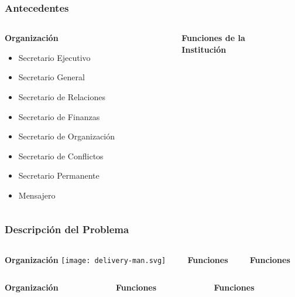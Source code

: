 \documentclass[xcolor=dvipsnames]{beamer}
\begin{document}
\begin{frame}
    \frametitle{Antecedentes}
    \begin{columns}
      \begin{column}{0.5\textwidth}
        \centering\textbf{Organización}
        \vspace{3mm}
        \begin{itemize}
            \item Secretario Ejecutivo
            \item Secretario General
            \item Secretario de Relaciones
            \item Secretario de Finanzas
            \item Secretario de Organización
            \item Secretario de Conflictos
            \item Secretario Permanente
            \item Mensajero
         \end{itemize} 
      \end{column}
      \begin{column}{0.5\textwidth} 
        \centering\textbf{Funciones de la\\Institución}
      \end{column}
    \end{columns}
\end{frame}

\begin{frame}
    \frametitle{Descripción del Problema}
    \begin{columns}
      \begin{column}{0.3\textwidth}
        \centering\textbf{Organización}
        \texttt{[image: delivery-man.svg]}
      \end{column}
      \begin{column}{0.3\textwidth} 
        \centering\textbf{Funciones}
      \end{column}
      \begin{column}{0.3\textwidth} 
        \centering\textbf{Funciones}
      \end{column}
    \end{columns}
    \begin{columns}
      \begin{column}{0.3\textwidth}
        \centering\textbf{Organización}
      \end{column}
      \begin{column}{0.3\textwidth} 
        \centering\textbf{Funciones}
      \end{column}
      \begin{column}{0.3\textwidth} 
        \centering\textbf{Funciones}
      \end{column}
    \end{columns}
\end{frame}
\end{document}
